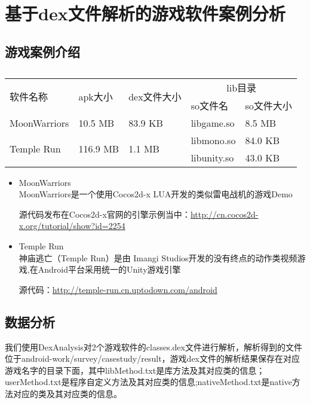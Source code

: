 \section{基于dex文件解析的游戏软件案例分析}
\label{dexanalysis}
\subsection{游戏案例介绍}
\label{sec:dexanalysis:case}
\begin{table}[H]
\caption{}
\begin{tabular}{|p{2.5cm}|p{2cm}|p{2.1cm}|p{2cm}|p{2cm}|}
\hline
\multirow{2}{*}{软件名称} & \multirow{2}{*}{apk大小}  & \multirow{2}{*}{dex文件大小} & \multicolumn{2}{|c|}{lib目录} \\
\cline{4-5}
& & & so文件名 & so文件大小\\
\hline
MoonWarriors & 10.5 MB & 83.9 KB & libgame.so & 8.5 MB \\
\hline
\multirow{2}{*}{Temple Run} & \multirow{2}{*}{116.9 MB} & \multirow{2}{*}{1.1 MB} & libmono.so & 84.0 KB\\
\cline{4-5}
& & & libunity.so & 43.0 KB\\
\hline
\end{tabular}
\end{table}

\begin{itemize}
\item MoonWarriors\\
MoonWarriors是一个使用Cocos2d-x LUA开发的类似雷电战机的游戏Demo

源代码发布在Cocos2d-x官网的引擎示例当中：\url{http://cn.cocos2d-x.org/tutorial/show?id=2254}

\item Temple Run\\
神庙逃亡（Temple Run）是由 Imangi Studios开发的没有终点的动作类视频游戏,在Android平台采用统一的Unity游戏引擎

源代码：\url{http://temple-run.cn.uptodown.com/android}

\end{itemize}

\subsection{数据分析}
\label{sec:dexanalysis:casestudy}
我们使用DexAnalysis对2个游戏软件的classes.dex文件进行解析，解析得到的文件位于android-work/survey/casestudy/result，游戏dex文件的解析结果保存在对应游戏名字的目录下面，其中libMethod.txt是库方法及其对应类的信息；userMethod.txt是程序自定义方法及其对应类的信息;nativeMethod.txt是native方法对应的类及其对应类的信息。

